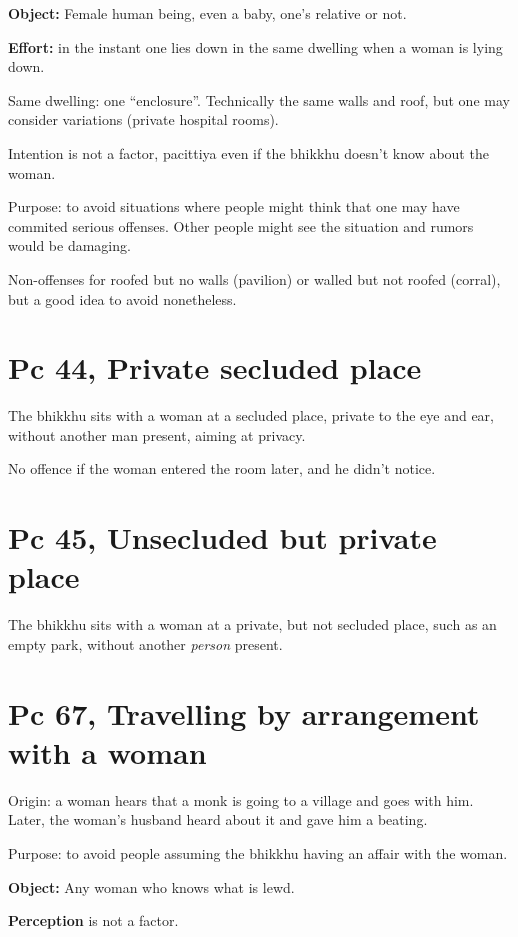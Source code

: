 \textbf{Object:} Female human being, even a baby, one's relative or not.

\textbf{Effort:} in the instant one lies down in the same dwelling when
a woman is lying down.

Same dwelling: one ``enclosure''. Technically the same walls and roof,
but one may consider variations (private hospital rooms).

Intention is not a factor, pacittiya even if the bhikkhu doesn't know
about the woman.

Purpose: to avoid situations where people might think that one may have
commited serious offenses. Other people might see the situation and
rumors would be damaging.

Non-offenses for roofed but no walls (pavilion) or walled but not roofed
(corral), but a good idea to avoid nonetheless.

\clearpage

\section{Pc 44, Private secluded place}

The bhikkhu sits with a woman at a secluded place, private to the eye
and ear, without another man present, aiming at privacy.

No offence if the woman entered the room later, and he didn't notice.

\section{Pc 45, Unsecluded but private place}

The bhikkhu sits with a woman at a private, but not secluded place, such
as an empty park, without another \emph{person} present.

\section{Pc 67, Travelling by arrangement with a woman}

Origin: a woman hears that a monk is going to a village and goes with
him. Later, the woman's husband heard about it and gave him a beating.

Purpose: to avoid people assuming the bhikkhu having an affair with the
woman.

\textbf{Object:} Any woman who knows what is lewd.

\textbf{Perception} is not a factor.

